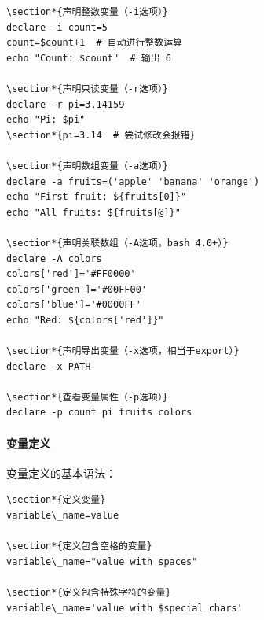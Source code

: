 \documentclass[12pt,UTF8]{ctexbook}
\begin{document}
\begin{verbatim}
\section*{声明整数变量（-i选项）}
declare -i count=5
count=$count+1  # 自动进行整数运算
echo "Count: $count"  # 输出 6

\section*{声明只读变量（-r选项）}
declare -r pi=3.14159
echo "Pi: $pi"
\section*{pi=3.14  # 尝试修改会报错}

\section*{声明数组变量（-a选项）}
declare -a fruits=('apple' 'banana' 'orange')
echo "First fruit: ${fruits[0]}"
echo "All fruits: ${fruits[@]}"

\section*{声明关联数组（-A选项，bash 4.0+）}
declare -A colors
colors['red']='#FF0000'
colors['green']='#00FF00'
colors['blue']='#0000FF'
echo "Red: ${colors['red']}"

\section*{声明导出变量（-x选项，相当于export）}
declare -x PATH

\section*{查看变量属性（-p选项）}
declare -p count pi fruits colors
\end{verbatim}

\paragraph{变量定义}
变量定义的基本语法：
\begin{verbatim}
\section*{定义变量}
variable\_name=value

\section*{定义包含空格的变量}
variable\_name="value with spaces"

\section*{定义包含特殊字符的变量}
variable\_name='value with $special chars'
\end{verbatim}
\end{document}
